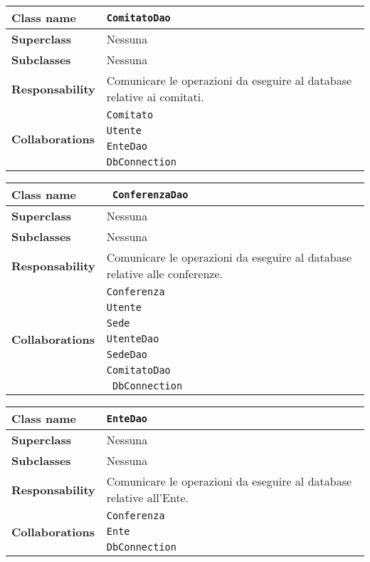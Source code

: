\begin{table}[h!]
	\begin{tabular}{|l|l|}
		\hline 
		\textbf{Class name} & \texttt{ComitatoDao}
		\\ \hline
		\textbf{Superclass} & Nessuna
		\\ \hline
		\multirow{1}{*}{\textbf{Subclasses}} & Nessuna
		\\ \hline
		\textbf{Responsability} & Comunicare le operazioni da eseguire al database relative ai comitati.
		\\ \hline
		\multirow{4}{*}{\textbf{Collaborations}} & \texttt{Comitato} \\ 
		& \texttt{Utente} \\
		& \texttt{EnteDao} \\
		& \texttt{DbConnection} \\
	\hline
	\end{tabular}
\end{table}

\begin{table}[h!]
	\begin{tabular}{|l|l|}
		\hline 
		\textbf{Class name} &\texttt{ ConferenzaDao}
		\\ \hline
		\textbf{Superclass} & Nessuna
		\\ \hline
		\multirow{1}{*}{\textbf{Subclasses}} & Nessuna
		\\ \hline
		\textbf{Responsability} & Comunicare le operazioni da eseguire al database relative alle conferenze.
		\\ \hline
		\multirow{7}{*}{\textbf{Collaborations}} & \texttt{Conferenza} \\ 
		& \texttt{Utente} \\
		& \texttt{Sede} \\
		& \texttt{UtenteDao}\\
		& \texttt{SedeDao }\\
		& \texttt{ComitatoDao }\\
		&\texttt{ DbConnection} \\ \hline
	\end{tabular}
\end{table}

\begin{table}[h!]
	\begin{tabular}{|l|l|}
		\hline 
		\textbf{Class name} & \texttt{EnteDao}
		\\ \hline
		\textbf{Superclass} & Nessuna
		\\ \hline
		\multirow{1}{*}{\textbf{Subclasses}} & Nessuna
		\\ \hline
		\textbf{Responsability} & Comunicare le operazioni da eseguire al database relative all'Ente.
		\\ \hline
		\multirow{3}{*}{\textbf{Collaborations}} & \texttt{Conferenza} \\ 
		& \texttt{Ente} \\
		& \texttt{DbConnection} \\ \hline
	\end{tabular}
\end{table}

